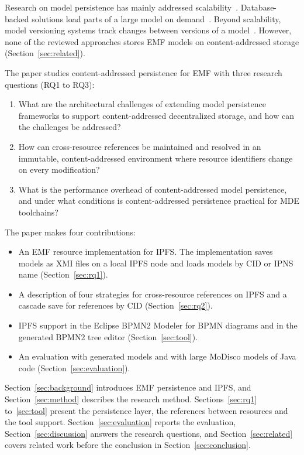 \documentclass[iicol,pdflatex,sn-mathphys-num]{sn-jnl}
\theoremstyle{thmstylethree}%
\begin{document}
Research on model persistence has mainly addressed scalability~\cite{kolovos2013roadmap}. Database-backed solutions load parts of a large model on demand~\cite{pagan2015repository,daniel2017neoemf}. Beyond scalability, model versioning systems track changes between versions of a model~\cite{koegel2010emfstore,altmanninger2009survey}. However, none of the reviewed approaches stores EMF models on content-addressed storage (Section~\ref{sec:related}).

The paper studies content-addressed persistence for EMF with three research questions (RQ1 to RQ3):

\begin{enumerate}
\item[RQ1] What are the architectural challenges of extending model persistence frameworks to support content-addressed decentralized storage, and how can the challenges be addressed?
\item[RQ2] How can cross-resource references be maintained and resolved in an immutable, content-addressed environment where resource identifiers change on every modification?
\item[RQ3] What is the performance overhead of content-addressed model persistence, and under what conditions is content-addressed persistence practical for MDE toolchains?
\end{enumerate}

The paper makes four contributions:
\begin{itemize}
\item An EMF resource implementation for IPFS. The implementation saves models as XMI files on a local IPFS node and loads models by CID or IPNS name (Section~\ref{sec:rq1}).
\item A description of four strategies for cross-resource references on IPFS and a cascade save for references by CID (Section~\ref{sec:rq2}).
\item IPFS support in the Eclipse BPMN2 Modeler for BPMN diagrams and in the generated BPMN2 tree editor (Section~\ref{sec:tool}).
\item An evaluation with generated models and with large MoDisco models of Java code (Section~\ref{sec:evaluation}).
\end{itemize}

Section~\ref{sec:background} introduces EMF persistence and IPFS, and Section~\ref{sec:method} describes the research method. Sections~\ref{sec:rq1} to~\ref{sec:tool} present the persistence layer, the references between resources and the tool support. Section~\ref{sec:evaluation} reports the evaluation, Section~\ref{sec:discussion} answers the research questions, and Section~\ref{sec:related} covers related work before the conclusion in Section~\ref{sec:conclusion}.
\end{document}
